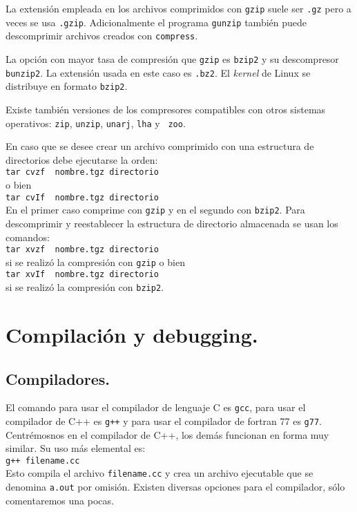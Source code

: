 La extensi{\'o}n empleada en los archivos comprimidos con \verb+gzip+
suele ser \verb+.gz+ pero a veces se usa \verb+.gzip+. Adicionalmente
el programa \verb+gunzip+ tambi{\'e}n puede descomprimir archivos creados
con \verb+compress+. 

La opci{\'o}n con mayor tasa de compresi{\'o}n que \verb+gzip+ es \verb+bzip2+
y su descompresor \verb+bunzip2+.  La extensi{\'o}n usada en este caso es
\verb+.bz2+.  El {\it kernel} de Linux se distribuye en formato
\verb+bzip2+.

Existe tambi{\'e}n versiones de los compresores compatibles con otros
sistemas operativos: \verb+zip+, \verb+unzip+, \verb+unarj+, \verb+lha+ y
\verb+ zoo+.

En caso que se desee crear un archivo comprimido con una estructura de
directorios debe ejecutarse la orden:\\ 
\verb+tar cvzf  nombre.tgz directorio+\\ 
o bien\\
\verb+tar cvIf  nombre.tgz directorio+\\
En el primer caso comprime con \verb+gzip+ y en el segundo con
\verb+bzip2+. Para descomprimir y reestablecer la estructura de
directorio almacenada se usan los comandos:\\
\verb+tar xvzf  nombre.tgz directorio+\\ 
si se realiz{\'o} la compresi{\'o}n con \verb+gzip+ o bien\\ 
\verb+tar xvIf  nombre.tgz directorio+\\
si se realiz{\'o} la compresi{\'o}n con \verb+bzip2+.


\section{Compilaci{\'o}n y debugging.}

\subsection{Compiladores.} 

El comando para usar el compilador de lenguaje C es \verb+gcc+, para
usar el compilador de C++ es \verb=g++= y para usar el compilador de
fortran 77 es \verb+g77+.  Centr{\'e}mosnos en el compilador de C++, los
dem{\'a}s funcionan en forma muy similar. Su uso m{\'a}s elemental es:\\
\verb=g++ filename.cc=\\
Esto compila el archivo \verb+filename.cc+ y crea un archivo
ejecutable que se denomina \verb+a.out+ por omisi{\'o}n. Existen diversas
opciones para el compilador, s{\'o}lo comentaremos una pocas.

